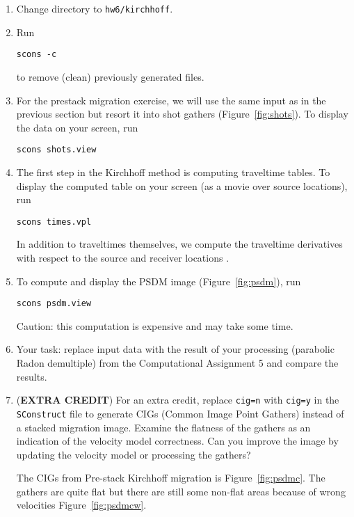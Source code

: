 \begin{enumerate}

\item Change directory to \texttt{hw6/kirchhoff}.
\item Run
\begin{verbatim}
scons -c
\end{verbatim}
to remove (clean) previously generated files.
\item For the prestack migration exercise, we will use the same input as in the previous section but resort it into shot gathers (Figure~\ref{fig:shots}). To display the data on your screen, run
\begin{verbatim}
scons shots.view
\end{verbatim}
\item The first step in the Kirchhoff method is computing traveltime tables. To display the computed table on your screen (as a movie over source locations), run
\begin{verbatim}
scons times.vpl
\end{verbatim}
In addition to traveltimes themselves, we compute the traveltime
derivatives with respect to the source and receiver
locations \cite[]{eikods}.
\item To compute and display the PSDM image (Figure~\ref{fig:psdm}), run 
\begin{verbatim}
scons psdm.view
\end{verbatim}
Caution: this computation is expensive and may take some time.

\item Your task: replace input data with the result of your processing (parabolic Radon demultiple) from the Computational Assignment 5 and compare the results.

\item (\textbf{EXTRA CREDIT}) For an extra credit, replace \texttt{cig=n} with \texttt{cig=y} in the \texttt{SConstruct} file to generate CIGs (Common Image Point Gathers) instead of a stacked migration image. Examine the flatness of the gathers as an indication of the velocity model correctness. Can you improve the image by updating the velocity model or processing the gathers?

The CIGs from Pre-stack Kirchhoff migration is Figure~\ref{fig:psdmc}. The gathers are quite flat but there are still some non-flat areas because of wrong velocities Figure~\ref{fig:psdmcw}.



\end{enumerate}

